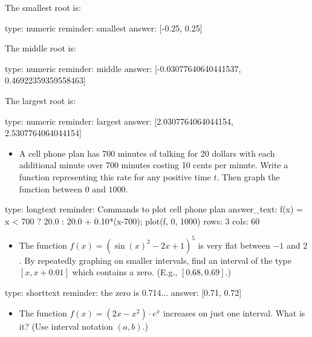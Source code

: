 \documentclass[12pt]{article}
\begin{document}
The smallest root is:

\begin{answer}
    type: numeric
    reminder: smallest
    answer: [-0.25, 0.25]

\end{answer}

The middle root is:

\begin{answer}
    type: numeric
    reminder: middle
    answer: [-0.03077640640441537, 0.46922359359558463]

\end{answer}

The largest root is:

\begin{answer}
    type: numeric
    reminder: largest
    answer: [2.0307764064044154, 2.5307764064044154]

\end{answer}

\begin{itemize}
\itemsep1pt\parskip0pt
\item
  A cell phone plan has 700 minutes of talking for 20 dollars with each
  additional minute over 700 minutes costing 10 cents per minute. Write
  a function representing this rate for any positive time $t$. Then
  graph the function between $0$ and $1000$.
\end{itemize}

\begin{answer}
type: longtext
reminder: Commands to plot cell phone plan
answer_text: f(x) = x < 700 ? 20.0  : 20.0 + 0.10*(x-700); plot(f, 0, 1000) 
rows: 3
cols: 60
\end{answer}

\begin{itemize}
\itemsep1pt\parskip0pt
\item
  The function $f(x) = (\sin(x)^2 - 2x + 1)^5$ is very flat between $-1$
  and $2$. By repeatedly graphing on smaller intervals, find an interval
  of the type $[x, x + 0.01]$ which contains a zero. (E.g.,
  $[0.68, 0.69]$.)
\end{itemize}

\begin{answer}
type: shorttext
reminder: the zero is 0.714...
answer: [0.71, 0.72]

\end{answer}

\begin{itemize}
\itemsep1pt\parskip0pt
\item
  The function $f(x) = (2x - x^2) \cdot e^x$ increases on just one
  interval. What is it? (Use interval notation $(a,b)$.)
\end{itemize}
\end{document}
